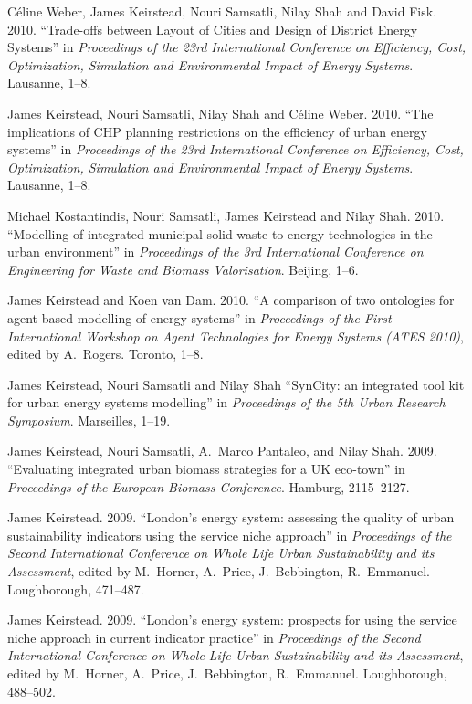 \documentclass[11pt,a4paper]{article}
\begin{document}
\ind C\'{e}line Weber, James Keirstead, Nouri Samsatli, Nilay Shah and David Fisk. 2010. ``Trade-offs between Layout of Cities and Design of District Energy Systems'' in \emph{Proceedings of the 23rd International Conference on Efficiency, Cost, Optimization, Simulation and Environmental Impact of Energy Systems}.  Lausanne, 1--8.

\ind James Keirstead, Nouri Samsatli, Nilay Shah and C\'{e}line Weber. 2010. ``The implications of CHP planning restrictions on the efficiency of urban energy systems'' in \emph{Proceedings of the 23rd International Conference on Efficiency, Cost, Optimization, Simulation and Environmental Impact of Energy Systems}.  Lausanne, 1--8.

\ind Michael Kostantindis, Nouri Samsatli, James Keirstead and Nilay Shah. 2010. ``Modelling of integrated municipal solid waste to energy technologies in the urban environment'' in \emph{Proceedings of the 3rd International Conference on Engineering for Waste and Biomass Valorisation}.  Beijing, 1--6.

\ind James Keirstead and Koen van Dam. 2010. ``A comparison of two ontologies for agent-based modelling of energy systems'' in \emph{Proceedings of the First International Workshop on Agent Technologies for Energy Systems (ATES 2010)}, edited by A.\ Rogers. Toronto, 1--8. 

\ind James Keirstead, Nouri Samsatli and Nilay Shah ``SynCity: an integrated tool kit for urban energy systems modelling'' in \emph{Proceedings of the 5th Urban Research Symposium}.  Marseilles, 1--19.

\ind James Keirstead, Nouri Samsatli, A.\ Marco Pantaleo, and Nilay Shah. 2009. ``Evaluating integrated urban biomass strategies for a UK eco-town'' in \emph{Proceedings of the European Biomass Conference}.  Hamburg, 2115--2127.

\ind James Keirstead. 2009. ``London's energy system: assessing the quality of urban sustainability indicators using the service niche approach'' in \emph{Proceedings of the Second International Conference on Whole Life Urban Sustainability and its Assessment}, edited by M.\ Horner, A.\ Price, J.\ Bebbington, R.\ Emmanuel.  Loughborough, 471--487.

\ind James Keirstead. 2009. ``London's energy system: prospects for using the service niche approach in current indicator practice'' in \emph{Proceedings of the Second International Conference on Whole Life Urban Sustainability and its Assessment}, edited by M.\ Horner, A.\ Price, J.\ Bebbington, R.\ Emmanuel.  Loughborough, 488--502.
\end{document}
